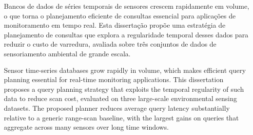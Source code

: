 \documentclass[
    oneside,
    idioma=english,
    bib=alf,
    refback,
    num=tradicional,
]{unbtex}
\begin{document}
\tituloestrangeiro{}

\autorii[]{}{}

\numerocutter{}

\coorientador[Co-advisor]{}{}{}

\publicacao{}



\membrodabancaiv{}
\membrodabancaivfuncao{}
\membrodabancav{}
\membrodabancavfuncao{}

\begin{Resumo}
Bancos de dados de s\'eries temporais de sensores crescem rapidamente em
volume, o que torna o planejamento eficiente de consultas essencial para
aplica\c{c}\~oes de monitoramento em tempo real. Esta disserta\c{c}\~ao
prop\~oe uma estrat\'egia de planejamento de consultas que explora a
regularidade temporal desses dados para reduzir o custo de varredura,
avaliada sobre tr\^es conjuntos de dados de sensoriamento ambiental de
grande escala.
\end{Resumo}

\begin{Abstract}
Sensor time-series databases grow rapidly in volume, which makes efficient
query planning essential for real-time monitoring applications. This
dissertation proposes a query planning strategy that exploits the temporal
regularity of such data to reduce scan cost, evaluated on three large-scale
environmental sensing datasets. The proposed planner reduces average query
latency substantially relative to a generic range-scan baseline, with the
largest gains on queries that aggregate across many sensors over long time
windows.
\end{Abstract}
\end{document}

